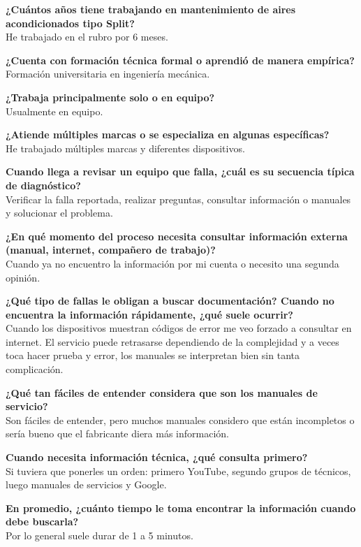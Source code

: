 {{    \textbf{¿Cuántos años tiene trabajando en mantenimiento de aires acondicionados tipo Split?}\\
    He trabajado en el rubro por 6 meses.

    \textbf{¿Cuenta con formación técnica formal o aprendió de manera empírica?}\\
    Formación universitaria en ingeniería mecánica.

    \textbf{¿Trabaja principalmente solo o en equipo?}\\
    Usualmente en equipo.

    \textbf{¿Atiende múltiples marcas o se especializa en algunas específicas?}\\
    He trabajado múltiples marcas y diferentes dispositivos.

    \textbf{Cuando llega a revisar un equipo que falla, ¿cuál es su secuencia típica de diagnóstico?}\\
    Verificar la falla reportada, realizar preguntas, consultar información o manuales y solucionar el problema.

    \textbf{¿En qué momento del proceso necesita consultar información externa (manual, internet, compañero de trabajo)?}\\
    Cuando ya no encuentro la información por mi cuenta o necesito una segunda opinión.

    \textbf{¿Qué tipo de fallas le obligan a buscar documentación? Cuando no encuentra la información rápidamente, ¿qué suele ocurrir?}\\
    Cuando los dispositivos muestran códigos de error me veo forzado a consultar en internet. El servicio puede retrasarse dependiendo de la complejidad y a veces toca hacer prueba y error, los manuales se interpretan bien sin tanta complicación.

    \textbf{¿Qué tan fáciles de entender considera que son los manuales de servicio?}\\
    Son fáciles de entender, pero muchos manuales considero que están incompletos o sería bueno que el fabricante diera más información.

    \textbf{Cuando necesita información técnica, ¿qué consulta primero?}\\
    Si tuviera que ponerles un orden: primero YouTube, segundo grupos de técnicos, luego manuales de servicios y Google.

    \textbf{En promedio, ¿cuánto tiempo le toma encontrar la información cuando debe buscarla?}\\
    Por lo general suele durar de 1 a 5 minutos.

}}
